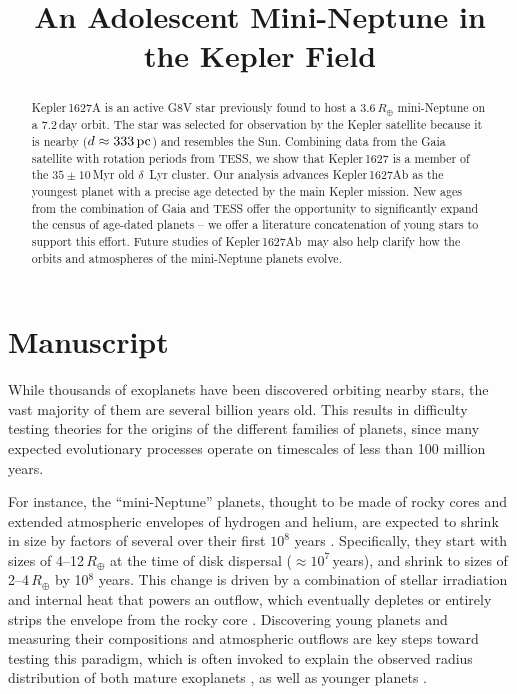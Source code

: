 \documentclass[12pt,modern,tighten]{aastex63}
\newcommand{\pn}{Kepler\,1627Ab} %
\begin{document}

\title{
  An Adolescent Mini-Neptune in the Kepler Field
}



\begin{abstract}
  Kepler\,1627A is an active G8V star previously found to host a
  $3.6\,R_\oplus$ mini-Neptune on a 7.2\,day orbit.  The star was
  selected for observation by the Kepler satellite because it is
  nearby ($d\approx 333\,{\rm pc}$) and resembles the Sun.  Combining
  data from the Gaia satellite with rotation periods from TESS, we
  show that Kepler\,1627 is a member of the $35\pm 10$\,Myr old
  $\delta$~Lyr cluster.  Our analysis advances Kepler\,1627Ab as the
  youngest planet with a precise age detected by the main Kepler
  mission.  New ages from the combination of Gaia and TESS offer the
  opportunity to significantly expand the census of age-dated planets
  -- we offer a literature concatenation of young stars to support
  this effort.  Future studies of \pn\ may also help clarify how the
  orbits and atmospheres of the mini-Neptune planets evolve.
\end{abstract}




\section{Manuscript}

While thousands of exoplanets have been discovered orbiting nearby
stars, the vast majority of them are several billion years old.  This
results in difficulty testing theories for the origins of the
different families of planets, since many expected evolutionary
processes operate on timescales of less than 100 million years.  

For instance, the ``mini-Neptune'' planets, thought to be made of
rocky cores and extended atmospheric envelopes of hydrogen and helium,
are expected to shrink in size by factors of several over their first
$10^8$ years \citep{owen_constraining_2020}.  Specifically, they start
with sizes of 4--12\,$R_\oplus$ at the time of disk dispersal
($\approx$$10^7$\,years), and shrink to sizes of 2--4\,$R_\oplus$ by
10$^8$ years.  This change is driven by a combination of stellar
irradiation and internal heat that powers an outflow, which eventually
depletes or entirely strips the envelope from the rocky core
\citep{Owen_Wu_2013,gupta_sculpting_2019}.  Discovering young planets
and measuring their compositions and atmospheric outflows are key
steps toward testing this paradigm, which is often invoked to explain
the observed radius distribution of both mature exoplanets
\citep{Fulton_et_al_2017}, as well as younger planets
\citep{bouma_cluster_2020}.
\end{document}
